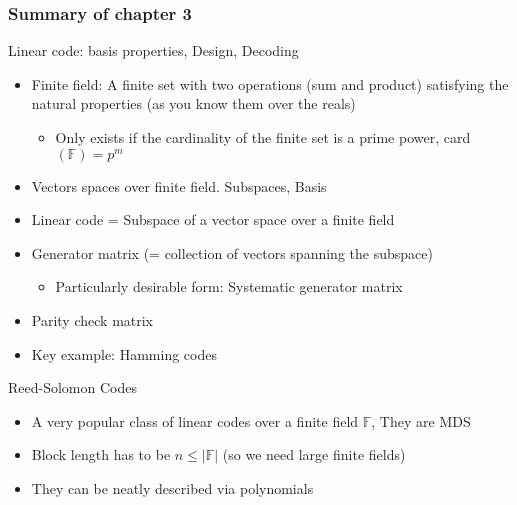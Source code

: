 \subsubsection{Summary of chapter 3}
\begin{parag}{Linear code: basis properties, Design, Decoding}
    \begin{itemize}
        \item Finite field: A finite set with two operations (sum and product) satisfying the natural properties (as you know them over the reals)
            \begin{itemize}
                \item Only exists if the cardinality of the finite set is a prime power, card$\left(\mathbb{F}\right) =  p^m$
            \end{itemize}
        \item Vectors spaces over finite field. Subspaces, Basis
        \item Linear code = Subspace of a vector space over a finite field
        \item Generator matrix (= collection of vectors spanning the subspace)
            \begin{itemize}
                \item Particularly desirable form: Systematic generator matrix
            \end{itemize}
        \item Parity check matrix
        \item Key example: Hamming codes
    \end{itemize}
\end{parag}
\begin{parag}{Reed-Solomon Codes}
    \begin{itemize}
        \item A very popular class of linear codes over a finite field $\mathbb{F}$, They are MDS
        \item Block length has to be $n \leq \left|\mathbb{F}\right|$ (so we need large finite fields)
        \item They can be neatly described via polynomials
    \end{itemize}
\end{parag}















